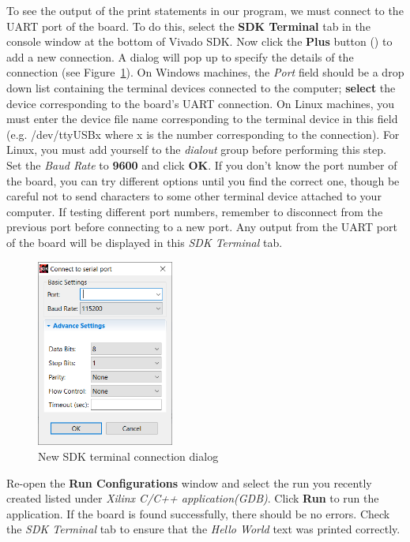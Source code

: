 \documentclass[11pt]{article}
\begin{document}
\newpage
To see the output of the print statements in our program, we must connect to the UART port of the board. To do this, select the \textbf{SDK Terminal} tab in the console window at the bottom of Vivado SDK. Now click the \textbf{Plus} button 
()
to add a new connection. A dialog will pop up to specify the details of the connection (see Figure~\ref{fig:sdk_conn_dialog}). On Windows machines, the \textit{Port} field should be a drop down list containing the terminal devices connected to the computer; \textbf{select} the device corresponding to the board's UART connection. On Linux machines, you must enter the device file name corresponding to the terminal device in this field (e.g. /dev/ttyUSBx where x is the number corresponding to the connection). For Linux, you must add yourself to the \textit{dialout} group before performing this step. Set the \textit{Baud Rate} to \textbf{9600} and click \textbf{OK}. If you don't know the port number of the board, you can try different options until you find the correct one, though be careful not to send characters to some other terminal device attached to your computer. If testing different port numbers, remember to disconnect from the previous port before connecting to a new port. Any output from the UART port of the board will be displayed in this \textit{SDK Terminal} tab.

\begin{figure}[h]
    \centering
    \includegraphics[width=0.4\textwidth]{images/sdk_conn_dialog.png}
    \caption{New SDK terminal connection dialog}
    \label{fig:sdk_conn_dialog}
\end{figure}

Re-open the \textbf{Run Configurations} window and select the run you recently created listed under \textit{Xilinx C/C++ application(GDB)}. Click \textbf{Run} to run the application. If the board is found successfully, there should be no errors. Check the \textit{SDK Terminal} tab to ensure that the \textit{Hello World} text was printed correctly.
\end{document}
